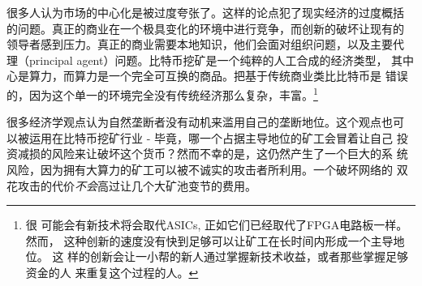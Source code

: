 \documentclass[letterpaper]{article}
\begin{document}
很多人认为市场的中心化是被过度夸张了。这样的论点犯了现实经济的过度概括
的问题。真正的商业在一个极具变化的环境中进行竞争，而创新的破坏让现有的
领导者感到压力。真正的商业需要本地知识，他们会面对组织问题，以及主要代
理（principal agent）问题。比特币挖矿是一个纯粹的人工合成的经济类型，
其中心是算力，而算力是一个完全可互换的商品。把基于传统商业类比比特币是
错误的，因为这个单一的环境完全没有传统经济那么复杂，丰富。\footnote{很
  可能会有新技术将会取代ASICs, 正如它们已经取代了FPGA电路板一样。然而，
  这种创新的速度没有快到足够可以让矿工在长时间内形成一个主导地位。 这
  样的创新会让一小帮的新人通过掌握新技术收益，或者那些掌握足够资金的人
  来重复这个过程的人。}


很多经济学观点认为自然垄断者没有动机来滥用自己的垄断地位。这个观点也可
以被运用在比特币挖矿行业 - 毕竟，哪一个占据主导地位的矿工会冒着让自己
投资减损的风险来让破坏这个货币？然而不幸的是，这仍然产生了一个巨大的系
统风险，因为拥有大算力的矿工可以被不诚实的攻击者所利用。一个破坏网络的
双花攻击的代价\emph{不会}高过让几个大矿池变节的费用。
\end{document}
